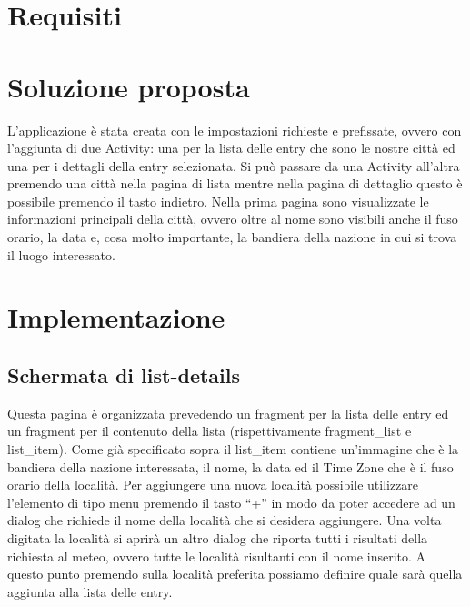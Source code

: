 \documentclass[twoside]{supsistudent}
\begin{document}
\maketitle
\onehalfspacing
\frontmatter


\tableofcontents

\mainmatter
{}
\setcounter{page}{1}


\chapter{Requisiti}

\chapter{Soluzione proposta}
L’applicazione è stata creata con le impostazioni richieste e prefissate, ovvero con l’aggiunta di due Activity: una per la lista delle entry che sono le nostre città ed una per i dettagli della entry selezionata.
Si può passare da una Activity all’altra premendo una città nella pagina di lista mentre nella pagina di dettaglio questo è possibile premendo il tasto indietro.
Nella prima pagina sono visualizzate le informazioni principali della città, ovvero oltre al nome sono visibili anche il fuso orario, la data e, cosa molto importante, la bandiera della nazione in cui si trova il luogo interessato.


\chapter{Implementazione}

\section{Schermata di list-details}
Questa pagina è organizzata prevedendo un fragment per la lista delle entry ed un fragment per il contenuto della lista (rispettivamente fragment\_list e list\_item).
Come già specificato sopra il list\_item contiene un’immagine che è la bandiera della nazione interessata, il nome, la data ed il Time Zone che è il fuso orario della località.
Per aggiungere una nuova località possibile utilizzare l’elemento di tipo menu premendo il tasto “+” in modo da poter accedere ad un dialog che richiede il nome della località che si desidera aggiungere. Una volta digitata la località si aprirà un altro dialog che riporta tutti i risultati della richiesta al meteo, ovvero tutte le località risultanti con il nome inserito. A questo punto premendo sulla località preferita possiamo definire quale sarà quella aggiunta alla lista delle entry.
\end{document}
